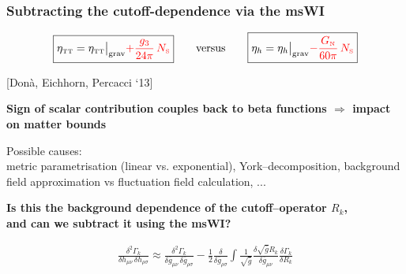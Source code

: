 \documentclass[]{beamer}  %
\newcommand\TTspace{ 0pt }
\newcommand\NS{ N_{\scriptscriptstyle{\mathrm{S}}} }
\newcommand\GNewton{ G_{\scriptscriptstyle{\mathrm{N}}}{} }
\newcommand\etaTT{ \eta_{\scriptscriptstyle{\mathrm{T\hspace{\TTspace}T}}} }
\begin{document}
\begin{frame}
  \frametitle{Subtracting the cutoff-dependence via the msWI}

  \begin{align*}
    \boxed{
      \etaTT = \etaTT \big|_\mathrm{grav} {\color{red} + \frac{ g_3 }{ 24 \pi } \, \NS}
    }
    \qquad
    \text{versus}
    \qquad
    \boxed{
      \eta_h = \eta_h \big|_\mathrm{grav} {\color{red} - \frac{ \GNewton }{ 60 \pi } \, \NS}
    }
  \end{align*}

  \vspace{-5pt}
  \fontsize{6pt}{7.2} \hfill [Don\`a, Eichhorn, Percacci `13]

  \vspace{5pt}
  \fontsize{8pt}{7.2}\selectfont
  \begin{center}
    \textbf{
      Sign of scalar contribution couples back to beta functions $\Rightarrow$ impact on matter bounds
    }
  \end{center}

  \vspace{-8pt}
  \fontsize{6pt}{7.2}\selectfont
  \vspace{3pt}
  Possible causes:\\
  metric parametrisation (linear vs. exponential), York--decomposition,
  background field approximation vs fluctuation
  field calculation, ...

  \vspace{5pt}
  \fontsize{8pt}{7.2}\selectfont
  \begin{center}
    \textbf{
      Is this the background dependence of the cutoff--operator $R_k$,\\
      and can we subtract it using the msWI?
    }
  \end{center}

  \vspace{-15pt}
  \begin{align*}
    \boxed{
      \frac{\delta^2 \Gamma_k}{\delta h_{\mu\nu} \, \delta h_{\rho\sigma}} \approx
      \frac{\delta^2 \Gamma_k}{\delta \bar g_{\mu\nu} \, \delta \bar g_{\rho\sigma}}
      - \frac 12 \frac{\delta}{\delta \bar g_{\rho\sigma}}
      \int \frac{1}{\sqrt{\bar g}}\frac{\delta \sqrt{\bar g} R_k}{\delta \bar g_{\mu\nu}}\frac{\delta
      \Gamma_k}{\delta R_k}
    }
  \end{align*}

  \vspace{5pt}
  \begin{columns}[T]
    \begin{column}{.8\textwidth}
      
    \end{column}


\end{columns}
\end{frame}
\end{document}
